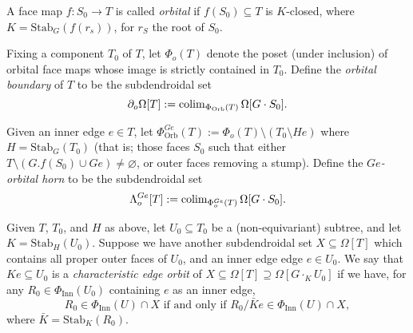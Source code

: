 \documentclass[a4paper,10pt,draft]{article}%
\numberwithin{equation}{section}%
\begin{document}
\begin{definition}
      A face map $f: S_0 \to T$ is called \textit{orbital} if
      $f(S_0) \subseteq T$ is $K$-closed, where $K = \mathrm{Stab}_G(f(r_s))$, for $r_S$ the root of $S_0$.

      Fixing a component $T_0$ of $T$,
      let $\Phi_{o}(T)$ denote the poset (under inclusion) of orbital face maps whose image is
      strictly contained in $T_0$.
      Define the \textit{orbital boundary} of $T$ to be the subdendroidal set
      \begin{equation}
            \partial_{o}\Omega[T] := \operatorname{colim}\limits_{\Phi_{\mathrm{Orb}}(T)}\Omega[G \cdot S_0].
      \end{equation}

      Given an inner edge $e \in T$, let
      $\Phi_{\mathrm{Orb}}^{Ge}(T) := \Phi_{o}(T) \setminus (T_0\setminus H e)$
      where $H = \mathrm{Stab}_G(T_0)$
      (that is; those faces $S_0$ such that either $T \setminus (G.f(S_0) \cup Ge) \neq \varnothing$, or
      outer faces removing a stump).
      Define the \textit{$Ge$-orbital horn} to be the subdendroidal set
      \begin{equation}
            \Lambda^{Ge}_{o}[T] := \operatorname{colim}\limits_{\Phi_{o}^{Ge}(T)}\Omega[G\cdot S_0]. 
      \end{equation}
\end{definition}

\begin{definition}
      Given $T$, $T_0$, and $H$ as above,
      let $U_0 \subseteq T_0$ be a (non-equivariant) subtree, and
      let $K = \mathrm{Stab}_H(U_0)$.
      Suppose we have another subdendroidal set $X \subseteq \Omega[T]$
      which contains all proper outer faces of $U_0$, and
      an inner edge edge $e \in U_0$.
      We say that $K e \subseteq U_0$ is a \textit{characteristic edge orbit} of
      $X \subseteq \Omega[T] \supseteq \Omega[G \cdot_K U_0]$
      if we have, for any $R_0 \in \Phi_{\mathrm{Inn}}(U_0)$ containing $e$ as an inner edge,
      \begin{equation}
            R_0 \in \Phi_{\mathrm{Inn}}(U) \cap X \mbox{ if and only if } R_0/ \bar K e \in \Phi_{\mathrm{Inn}}(U) \cap X,
      \end{equation}
      where $\bar K = \mathrm{Stab}_{K}(R_0)$. 
\end{definition}
\end{document}
